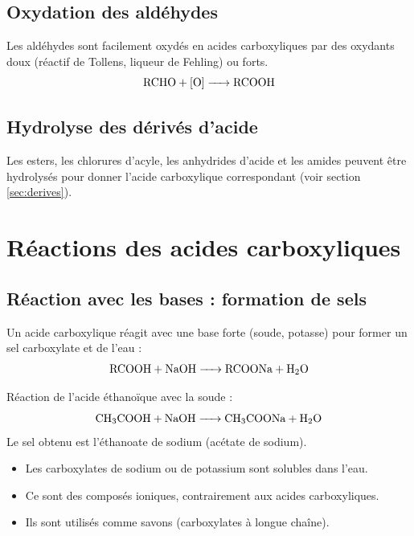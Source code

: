 \subsection{Oxydation des aldéhydes}

\begin{propriete}
Les aldéhydes sont facilement oxydés en acides carboxyliques par des oxydants doux (réactif de Tollens, liqueur de Fehling) ou forts.
\[
\ce{RCHO + [O] -> RCOOH}
\]
\end{propriete}

\subsection{Hydrolyse des dérivés d'acide}

\begin{remarque}
Les esters, les chlorures d'acyle, les anhydrides d'acide et les amides peuvent être hydrolysés pour donner l'acide carboxylique correspondant (voir section \ref{sec:derives}).
\end{remarque}

\section{Réactions des acides carboxyliques}

\subsection{Réaction avec les bases : formation de sels}

\begin{loi}[Neutralisation]
Un acide carboxylique réagit avec une base forte (soude, potasse) pour former un sel carboxylate et de l'eau :
\[
\ce{RCOOH + NaOH -> RCOONa + H2O}
\]
\end{loi}

\begin{exemple}
Réaction de l'acide éthanoïque avec la soude :
\[
\ce{CH3COOH + NaOH -> CH3COONa + H2O}
\]
Le sel obtenu est l'éthanoate de sodium (acétate de sodium).
\end{exemple}

\begin{propriete}
\begin{itemize}
    \item Les carboxylates de sodium ou de potassium sont solubles dans l'eau.
    \item Ce sont des composés ioniques, contrairement aux acides carboxyliques.
    \item Ils sont utilisés comme savons (carboxylates à longue chaîne).
\end{itemize}
\end{propriete}

